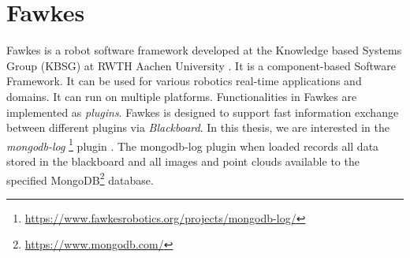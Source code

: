 \section{Fawkes}
Fawkes is a robot software framework developed at the Knowledge based Systems Group  (KBSG) at RWTH Aachen University \citep{niemueller2010design}. It is a component-based Software Framework. It can be used for various robotics real-time applications and domains. It can run on multiple platforms. Functionalities in Fawkes are implemented as \emph{plugins}. Fawkes is designed to support fast information exchange  between different plugins via \emph{Blackboard}. In this thesis, we are interested in the \emph{mongodb-log} \footnote{\url{https://www.fawkesrobotics.org/projects/mongodb-log/}} plugin \citep{niemueller2012generic}. The mongodb-log plugin when loaded records all data stored in the blackboard  and all images and point clouds available to the specified MongoDB\footnote{\url{https://www.mongodb.com/}} database. 